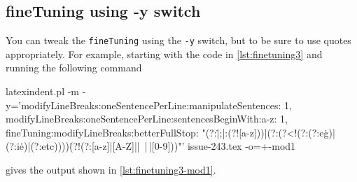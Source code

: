 \subsection{fineTuning using -y switch}
 \begin{example}
 You can tweak the \texttt{fineTuning} using the \texttt{-y} switch, but to be sure to
 use quotes appropriately. For example, starting with the code in \cref{lst:finetuning3}
 and running the following command

 \begin{commandshell}
latexindent.pl -m -y='modifyLineBreaks:oneSentencePerLine:manipulateSentences: 1, modifyLineBreaks:oneSentencePerLine:sentencesBeginWith:a-z: 1, fineTuning:modifyLineBreaks:betterFullStop: "(?:\.|;|:(?![a-z]))|(?:(?<!(?:(?:e\.g)|(?:i\.e)|(?:etc))))\.(?!(?:[a-z]|[A-Z]|\-|~|\,|[0-9]))"' issue-243.tex -o=+-mod1
\end{commandshell}

 gives the output shown in \cref{lst:finetuning3-mod1}.

 \end{example}
